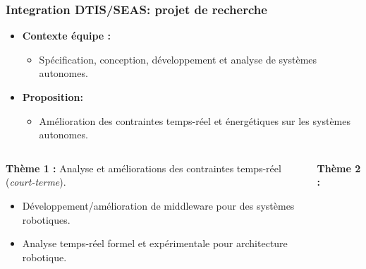 \documentclass[xcolor=table]{beamer}
\begin{document}
\begin{frame}
	\frametitle{Integration DTIS/SEAS: projet de recherche}
	
	\begin{itemize}
		\item \textbf{Contexte équipe :}
		\begin{itemize}
			\item Spécification, conception, développement et analyse de systèmes autonomes.
		\end{itemize}
		\item \textbf{Proposition:}
		\begin{itemize}
			\item Amélioration des contraintes temps-réel et énergétiques sur les systèmes autonomes.
		\end{itemize}
	\end{itemize}
	\begin{columns}
		\begin{column}{.45\textwidth}
			\textbf{Thème 1 :} Analyse et améliorations des contraintes temps-réel (\textit{court-terme}).
			\begin{itemize}
				\item Développement/amélioration de middleware pour des systèmes robotiques.
				\item Analyse temps-réel formel et expérimentale pour architecture robotique.
			\end{itemize}
		\end{column}
		\begin{column}{.45\textwidth}
			\textbf{Thème 2 :} 
		\end{column}
	\end{columns}
	
\end{frame}
\end{document}
